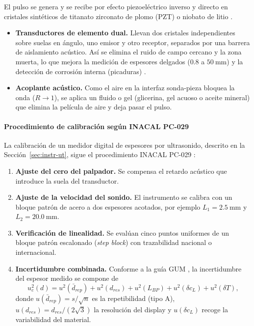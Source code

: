 El pulso se genera y se recibe por efecto piezoeléctrico inverso y directo en
cristales sintéticos de titanato zirconato de plomo (PZT) o niobato de litio
\parencite{cheeke2017}.

\begin{itemize}
  \item \textbf{Transductores de elemento dual.} Llevan dos cristales independientes
        sobre suelas en ángulo, uno emisor y otro receptor, separados por una barrera
        de aislamiento acústico. Así se elimina el ruido de campo cercano y la zona
        muerta, lo que mejora la medición de espesores delgados
        ($0.8$ a $50\ \text{mm}$) y la detección de corrosión interna (picaduras)
        \parencite{astm_e797}.
  \item \textbf{Acoplante acústico.} Como el aire en la interfaz sonda-pieza bloquea
        la onda ($R\to 1$), se aplica un fluido o gel (glicerina, gel acuoso o aceite
        mineral) que elimina la película de aire y deja pasar el pulso.
\end{itemize}

\paragraph{Procedimiento de calibración según INACAL PC-029}

La calibración de un medidor digital de espesores por ultrasonido, descrito en la
Sección~\ref{sec:instr-ut}, sigue el procedimiento INACAL PC-029
\parencite{inacal_pc029, astm_e797}:

\begin{enumerate}
  \item \textbf{Ajuste del cero del palpador.} Se compensa el retardo acústico que
        introduce la suela del transductor.
  \item \textbf{Ajuste de la velocidad del sonido.} El instrumento se calibra con un
        bloque patrón de acero a dos espesores acotados, por ejemplo
        $L_1 = 2.5\ \text{mm}$ y $L_2 = 20.0\ \text{mm}$.
  \item \textbf{Verificación de linealidad.} Se evalúan cinco puntos uniformes de un
        bloque patrón escalonado (\textit{step block}) con trazabilidad nacional o
        internacional.
  \item \textbf{Incertidumbre combinada.} Conforme a la guía GUM
        \parencite{jcgm2008gum}, la incertidumbre del espesor medido se compone de
        \begin{equation}
          u_c^2(d) = u^2(\bar{d}_{rep}) + u^2(d_{res}) + u^2(L_{BP})
                     + u^2(\delta c_L) + u^2(\delta T),
          \label{eq:ut-incertidumbre}
        \end{equation}
        donde $u(\bar{d}_{rep}) = s/\sqrt{n}$ es la repetibilidad (tipo A),
        $u(d_{res}) = d_{res}/(2\sqrt{3})$ la resolución del display y
        $u(\delta c_L)$ recoge la variabilidad del material.
\end{enumerate}


